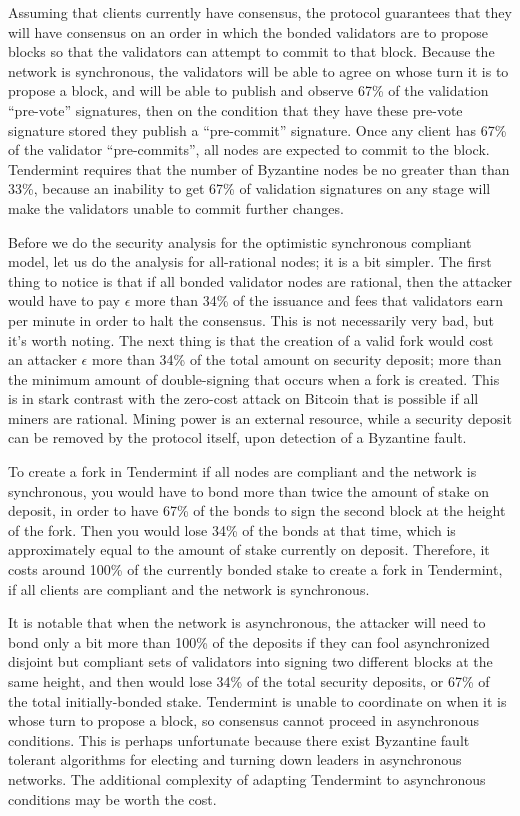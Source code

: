 \documentclass[11pt,a4paper]{article}
\theoremstyle{plain}
\theoremstyle{definition}
\begin{document}
Assuming that clients currently have consensus, the protocol guarantees that they will have consensus on an order in which the bonded validators are to propose blocks so that the validators can attempt to commit to that block. Because the network is synchronous, the validators will be able to agree on whose turn it is to propose a block, and will be able to publish and observe 67\% of the validation ``pre-vote'' signatures, then on the condition that they have these pre-vote signature stored they publish a ``pre-commit'' signature. Once any client has 67\% of the validator ``pre-commits'', all nodes are expected to commit to the block. Tendermint requires that the number of Byzantine nodes be no greater than than 33\%, because an inability to get 67\% of validation signatures on any stage will make the validators unable to commit further changes. 

Before we do the security analysis for the optimistic synchronous compliant model, let us do the analysis for all-rational nodes; it is a bit simpler. The first thing to notice is that if all bonded validator nodes are rational, then the attacker would have to pay $\epsilon$ more than 34\% of the issuance and fees that validators earn per minute in order to halt the consensus. This is not necessarily very bad, but it's worth noting. The next thing is that the creation of a valid fork would cost an attacker $\epsilon$ more than 34\% of the total amount on security deposit; more than the minimum amount of double-signing that occurs when a fork is created. This is in stark contrast with the zero-cost attack on Bitcoin that is possible if all miners are rational. Mining power is an external resource, while a security deposit can be removed by the protocol itself, upon detection of a Byzantine fault.

To create a fork in Tendermint if all nodes are compliant and the network is synchronous, you would have to bond more than twice the amount of stake on deposit, in order to have 67\% of the bonds to sign the second block at the height of the fork. Then you would lose 34\% of the bonds at that time, which is approximately equal to the amount of stake currently on deposit. Therefore, it costs around 100\% of the currently bonded stake to create a fork in Tendermint, if all clients are compliant and the network is synchronous.

It is notable that when the network is asynchronous, the attacker will need to bond only a bit more than 100\% of the deposits if they can fool asynchronized disjoint but compliant sets of validators into signing two different blocks at the same height, and then would lose 34\% of the total security deposits, or 67\% of the total initially-bonded stake. Tendermint is unable to coordinate on when it is whose turn to propose a block, so consensus cannot proceed in asynchronous conditions. This is perhaps unfortunate because there exist Byzantine fault tolerant algorithms for electing and turning down leaders in asynchronous networks. The additional complexity of adapting Tendermint to asynchronous conditions may be worth the cost.
\end{document}
